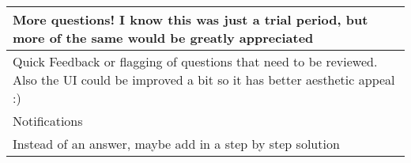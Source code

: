 \begin{longtable}{|p{1\linewidth}|}
		\hline
		More questions!  I know this was just a trial period, but more of the same would be greatly appreciated                                                                                                                                                                                                                                                                                                                                                                                                                                                                                                                                                                                          \\
		\hline
		Quick Feedback or flagging of questions that need to be reviewed. Also the UI could be improved a bit so it has better aesthetic appeal :)                                                                                                                                                                                                                                                                                                                                                                                                                                                                                                                                                       \\
		\hline
		Notifications                                                                                                                                                                                                                                                                                                                                                                                                                                                                                                                                                                                                                                                                                    \\
		\hline
		Instead of an answer, maybe add in a step by step solution                                                                                                                                                                                                                                                                                                                                                                                                                                                                                                                                                                                                                                       \\

\end{longtable}
